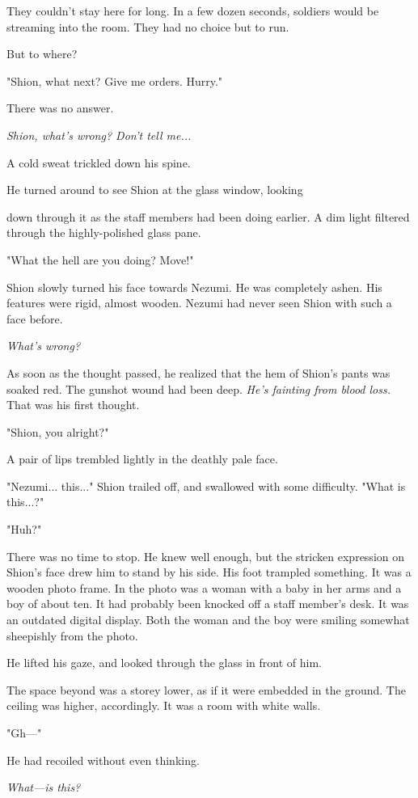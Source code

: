 They couldn't stay here for long. In a few dozen seconds, soldiers would
be streaming into the room. They had no choice but to run.~

But to where?

"Shion, what next? Give me orders. Hurry."

There was no answer.

\emph{Shion, what's wrong? Don't tell me...}

A cold sweat trickled down his spine.

He turned around to see Shion at the glass window, looking~

down through it as the staff members had been doing earlier. A dim light
filtered through the highly-polished glass pane.

"What the hell are you doing? Move!"

Shion slowly turned his face towards Nezumi. He was completely ashen.
His features were rigid, almost wooden. Nezumi had never seen Shion with
such a face before.

\emph{What's wrong?}

As soon as the thought passed, he realized that the hem of Shion's pants
was soaked red. The gunshot wound had been deep. \emph{He's fainting from
blood loss.} That was his first thought.

"Shion, you alright?"

A pair of lips trembled lightly in the deathly pale face.

"Nezumi... this..." Shion trailed off, and swallowed with some
difficulty. "What is this...?"

"Huh?"

There was no time to stop. He knew well enough, but the stricken
expression on Shion's face drew him to stand by his side. His foot
trampled something. It was a wooden photo frame. In the photo was a
woman with a baby in her arms and a boy of about ten. It had probably
been knocked off a staff member's desk. It was an outdated digital
display. Both the woman and the boy were smiling somewhat sheepishly
from the photo.

He lifted his gaze, and looked through the glass in front of him.

The space beyond was a storey lower, as if it were embedded in the
ground. The ceiling was higher, accordingly. It was a room with white
walls.

"Gh---"

He had recoiled without even thinking.

\emph{What---is this?}